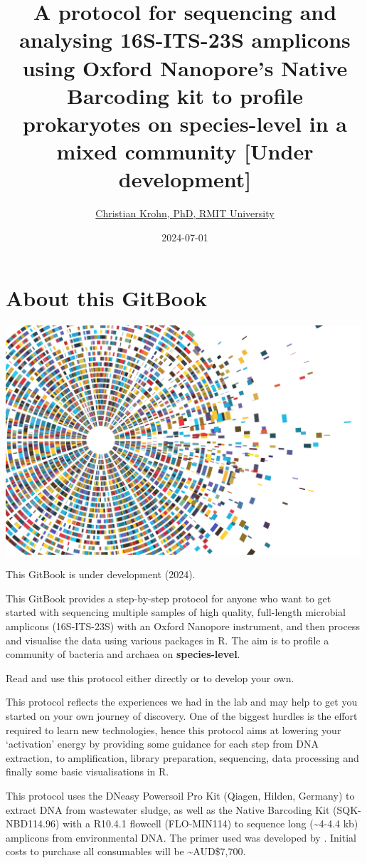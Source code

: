 \documentclass[
]{book}
\title{A protocol for sequencing and analysing 16S-ITS-23S amplicons using Oxford Nanopore's Native Barcoding kit to profile prokaryotes on species-level in a mixed community {[}Under development{]}}
\author{\href{https://www.rmit.edu.au/contact/staff-contacts/academic-staff/k/krohn---christian}{Christian Krohn, PhD, RMIT University}}
\date{2024-07-01}
\begin{document}
\maketitle

{
\setcounter{tocdepth}{1}
\tableofcontents
}
\chapter{About this GitBook}\label{about}

\includegraphics[width=5.20833in,height=\textheight]{./img/vectorstock_23650232.jpg}

This GitBook is under development (2024).

This GitBook provides a step-by-step protocol for anyone who want to get started with sequencing multiple samples of high quality, full-length microbial amplicons (16S-ITS-23S) with an Oxford Nanopore instrument, and then process and visualise the data using various packages in R. The aim is to profile a community of bacteria and archaea on \textbf{species-level}.

Read and use this protocol either directly or to develop your own.

This protocol reflects the experiences we had in the lab and may help to get you started on your own journey of discovery. One of the biggest hurdles is the effort required to learn new technologies, hence this protocol aims at lowering your `activation' energy by providing some guidance for each step from DNA extraction, to amplification, library preparation, sequencing, data processing and finally some basic visualisations in R.

This protocol uses the DNeasy Powersoil Pro Kit (Qiagen, Hilden, Germany) to extract DNA from wastewater sludge, as well as the Native Barcoding Kit (SQK-NBD114.96) with a R10.4.1 flowcell (FLO-MIN114) to sequence long (\textasciitilde4-4.4 kb) amplicons from environmental DNA. The primer used was developed by \citep{Martijn2019}. Initial costs to purchase all consumables will be \textasciitilde AUD\$7,700.
\end{document}
